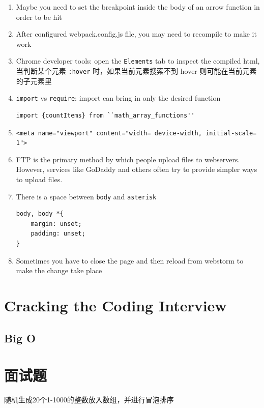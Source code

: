 \documentclass[a4paper, 12pt]{article}
\begin{document}
\begin{enumerate}
\item Maybe you need to set the breakpoint inside the body of an arrow function in order to be hit

\item After configured webpack.config.js file, you may need to recompile to make it work

\item Chrome developer tools: open the \verb|Elements| tab to inspect the compiled html, 当判断某个元素 \verb|:hover| 时，如果当前元素搜索不到 hover 则可能在当前元素的子元素里

\item \verb|import| vs \verb|require|: import can bring in only the desired function
\begin{verbatim}
import {countItems} from ``math_array_functions''
\end{verbatim}

\item \verb|<meta name="viewport" content="width= device-width, initial-scale= 1">|

\item  FTP is the primary method by which people upload files to webservers. However, services like GoDaddy and others often try to provide simpler ways to upload files.

\item There is a space between \verb|body| and \verb|asterisk|
\begin{verbatim}
body, body *{
    margin: unset;
    padding: unset;
}
\end{verbatim}

\item Sometimes you have to close the page and then reload from webstorm to make the change take place
\end{enumerate}


\section{Cracking the Coding Interview}
\subsection{Big O}


\section{面试题}
随机生成20个1-1000的整数放入数组，并进行冒泡排序

\end{document}
